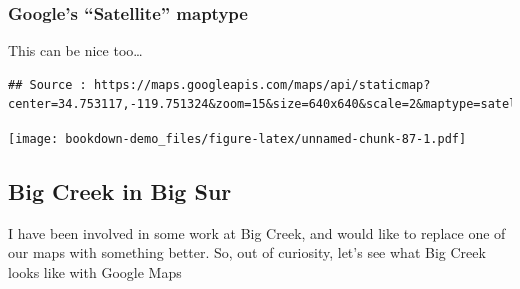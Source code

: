\documentclass[]{book}
\newenvironment{Shaded}{\begin{snugshade}}{\end{snugshade}}
\newcommand{\KeywordTok}[1]{\textcolor[rgb]{0.13,0.29,0.53}{\textbf{{#1}}}}
\newcommand{\DataTypeTok}[1]{\textcolor[rgb]{0.13,0.29,0.53}{{#1}}}
\newcommand{\DecValTok}[1]{\textcolor[rgb]{0.00,0.00,0.81}{{#1}}}
\newcommand{\FloatTok}[1]{\textcolor[rgb]{0.00,0.00,0.81}{{#1}}}
\newcommand{\StringTok}[1]{\textcolor[rgb]{0.31,0.60,0.02}{{#1}}}
\newcommand{\NormalTok}[1]{{#1}}
\theoremstyle{definition}
\theoremstyle{definition}
\theoremstyle{remark}
\begin{document}
\subsubsection{\texorpdfstring{Google's ``Satellite''
maptype}{Google's Satellite maptype}}\label{googles-satellite-maptype}

This can be nice too\ldots{}

\begin{Shaded}
\end{Shaded}

\begin{verbatim}
## Source : https://maps.googleapis.com/maps/api/staticmap?center=34.753117,-119.751324&zoom=15&size=640x640&scale=2&maptype=satellite
\end{verbatim}

\texttt{[image: bookdown-demo\_files/figure-latex/unnamed-chunk-87-1.pdf]}

\subsection{Big Creek in Big Sur}\label{big-creek-in-big-sur}

I have been involved in some work at Big Creek, and would like to
replace one of our maps with something better. So, out of curiosity,
let's see what Big Creek looks like with Google Maps
\end{document}
